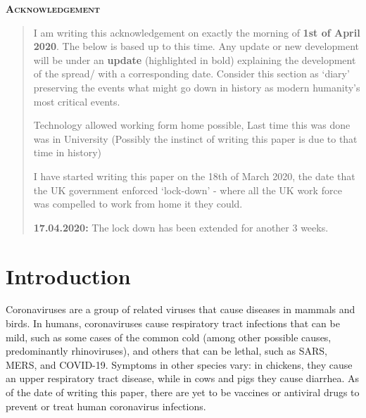 \documentclass[fontsize=17pt]{article}
\begin{document}
\newpage
\begin{abstract}
In this paper we are going to explain the approaches for the mathematical modelling of the spread of infectious diseases such as Coronavirus (COVD-19, SARS-CoV-2). This paper will explain the classic compartmental models in the epidemics literature such as SIR, SIS, SEIR etc. It also explains key concepts such was reproduction number, final size equation, and the key theorems that are implied by these concepts.
\end{abstract}
\renewenvironment{abstract}
{
	\centerline
	{\large \bfseries \scshape Acknowledgement}
	\begin{quote}
	}
	{
	\end{quote}
}
\begin{abstract}
I am writing this acknowledgement on exactly the morning of \textbf{1st of April 2020}. The below is based up to this time.
Any update or new development will be under an \textbf{update} (highlighted in bold) explaining the development of the spread/ with a corresponding date. Consider this section as `diary' preserving the events what might go down in history as modern humanity's most critical events. 

Technology allowed working form home possible, Last time this was done was in University (Possibly the instinct of writing this paper is due to that time in history)

I have started writing this paper on the 18th of March 2020, the date that the UK government enforced `lock-down' - where all the UK work force was compelled to work from home it they could. 

\textbf{17.04.2020: } The lock down has been extended for another 3 weeks.

\end{abstract}


\tableofcontents
\newpage



\section{Introduction}
Coronaviruses are a group of related viruses that cause diseases in mammals and birds. In humans, coronaviruses cause respiratory tract infections that can be mild, such as some cases of the common cold (among other possible causes, predominantly rhinoviruses), and others that can be lethal, such as SARS, MERS, and COVID-19. Symptoms in other species vary: in chickens, they cause an upper respiratory tract disease, while in cows and pigs they cause diarrhea. As of the date of writing this paper, there are yet to be vaccines or antiviral drugs to prevent or treat human coronavirus infections.
\end{document}
